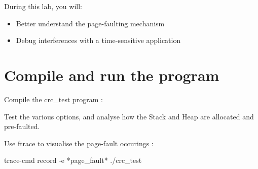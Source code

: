 
During this lab, you will:
\begin{itemize}
  \item Better understand the page-faulting mechanism
  \item Debug interferences with a time-sensitive application
\end{itemize}

\section{Compile and run the program}

Compile the crc\_test program : 

Test the various options, and analyse how the Stack and Heap are allocated and
pre-faulted.

Use ftrace to visualise the page-fault occurings :
\begin{bashinput}
	trace-cmd record -e *page_fault* ./crc_test
\end{bashinput}

